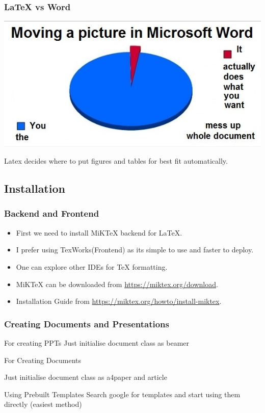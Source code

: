 \documentclass{beamer}
\begin{document}
\begin{frame}
\frametitle{LaTeX vs Word}
%
\begin{center}
%
\includegraphics[width=0.75\linewidth]{144}
\end{center}
%
Latex decides where to put figures and tables for best fit automatically.
\end{frame}
\subsection{Installation} 

\begin{frame}
\frametitle{Backend and Frontend}
\begin{itemize}
\item First we need to install MiKTeX backend for LaTeX.
\item I prefer using TexWorks(Frontend) as its simple to use and faster to deploy.
\item One can explore other IDEs for TeX formatting.
\item MiKTeX can be downloaded from \url{https://miktex.org/download}.
\item Installation Guide from \url{https://miktex.org/howto/install-miktex}.
\end{itemize}

\end{frame}


\begin{frame}
\frametitle{Creating Documents and Presentations}
\begin{block}{For creating PPTs}
Just initialise document class as  beamer
\end{block}

\begin{block}{For Creating Documents}

Just initialise document class as a4paper and article

\end{block}

\begin{block}{Using Prebuilt Templates}
Search google for templates and start using them directly (easiest method)
\end{block}
\end{frame}
\end{document}
